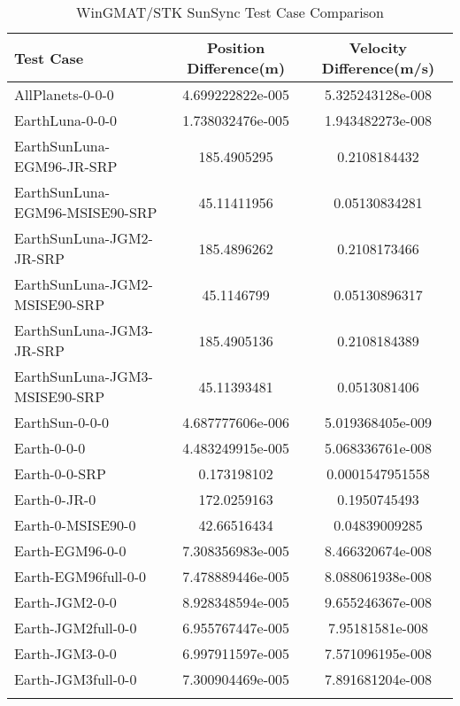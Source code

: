 \begin{table}[htbp!]
\centering
\caption{ WinGMAT/STK SunSync Test Case Comparison}
      \begin{tabular}{lcc}
      \hline\hline
          Test Case & Position Difference(m) & Velocity Difference(m/s) \\
         \hline
         AllPlanets-0-0-0 & 4.699222822e-005 & 5.325243128e-008 \\
         EarthLuna-0-0-0 & 1.738032476e-005 & 1.943482273e-008 \\
         EarthSunLuna-EGM96-JR-SRP & 185.4905295 & 0.2108184432 \\
         EarthSunLuna-EGM96-MSISE90-SRP & 45.11411956 & 0.05130834281 \\
         EarthSunLuna-JGM2-JR-SRP & 185.4896262 & 0.2108173466 \\
         EarthSunLuna-JGM2-MSISE90-SRP & 45.1146799 & 0.05130896317 \\
         EarthSunLuna-JGM3-JR-SRP & 185.4905136 & 0.2108184389 \\
         EarthSunLuna-JGM3-MSISE90-SRP & 45.11393481 & 0.0513081406 \\
         EarthSun-0-0-0 & 4.687777606e-006 & 5.019368405e-009 \\
         Earth-0-0-0 & 4.483249915e-005 & 5.068336761e-008 \\
         Earth-0-0-SRP & 0.173198102 & 0.0001547951558 \\
         Earth-0-JR-0 & 172.0259163 & 0.1950745493 \\
         Earth-0-MSISE90-0 & 42.66516434 & 0.04839009285 \\
         Earth-EGM96-0-0 & 7.308356983e-005 & 8.466320674e-008 \\
         Earth-EGM96full-0-0 & 7.478889446e-005 & 8.088061938e-008 \\
         Earth-JGM2-0-0 & 8.928348594e-005 & 9.655246367e-008 \\
         Earth-JGM2full-0-0 & 6.955767447e-005 & 7.95181581e-008 \\
         Earth-JGM3-0-0 & 6.997911597e-005 & 7.571096195e-008 \\
         Earth-JGM3full-0-0 & 7.300904469e-005 & 7.891681204e-008 \\
      \hline\hline
      \label{Table: SunSync WinGMAT-STK Table} 
\end{tabular}
\end{table}
